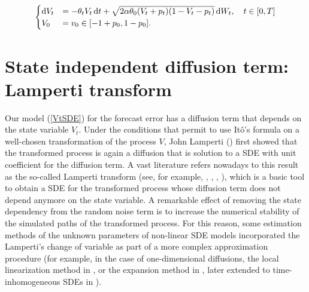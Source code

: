 \documentclass[11pt]{article}
\theoremstyle{definition}
\begin{document}
\begin{equation}
\begin{cases}
\dif V_t&=  - \theta_t V_t\dif t + \sqrt{2 \alpha \theta_0 (V_t +p_t ) (1-V_t-p_t)}\dif W_t, \quad t \in [0,T]  \\
V_0&=  v_0\in [-1 + p_0,1 - p_0].
\end{cases}  \label{VtSDE}
\end{equation}



\section{State independent diffusion term: Lamperti transform} \label{Section_4}

Our model (\ref{VtSDE}) for the forecast error has a diffusion term that depends on the state variable $V_t$. Under the conditions that permit to use It\^{o}'s formula on a well-chosen transformation of the process $V$, John Lamperti (\cite{lamp}) first showed that the transformed process is again a diffusion that is solution to a SDE with unit coefficient for the diffusion term. 
A vast literature refers nowadays to this result as the so-called Lamperti transform (see, for example, \cite[40--41]{iacus1}, \cite{moma}, \cite[199--203]{pani}, \cite[98--100]{saso}), which is a basic tool to obtain a SDE for the transformed process whose diffusion term does not depend anymore on the state variable. A remarkable effect of removing the state dependency from the random noise term is to increase the numerical stability of the simulated paths of the transformed process. 
For this reason, some estimation methods of the unknown parameters of non-linear SDE models incorporated the Lamperti's change of variable as part of a more complex approximation procedure (for example, in the case of one-dimensional diffusions, the local linearization method in  \cite{shoz}, or the expansion method in \cite{ait}, later extended to time-inhomogeneous SDEs in \cite{eglix}).
\end{document}

